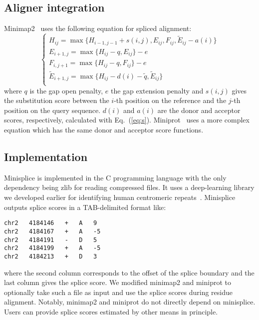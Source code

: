 \documentclass[webpdf,contemporary,large,namedate]{oup-authoring-template}%
\begin{document}
\subsection{Aligner integration}

Minimap2~\citep{Li:2018ab} uses the following equation for spliced alignment:
\begin{equation}\label{eq:splice}
\left\{\begin{array}{l}
H_{ij} = \max\{H_{i-1,j-1}+s(i,j),E_{ij},F_{ij},\tilde{E}_{ij}-a(i)\}\\
E_{i+1,j}= \max\{H_{ij}-q,E_{ij}\}-e\\
F_{i,j+1}= \max\{H_{ij}-q,F_{ij}\}-e\\
\tilde{E}_{i+1,j}= \max\{H_{ij}-d(i)-\tilde{q},\tilde{E}_{ij}\}\\
\end{array}\right.
\end{equation}
where $q$ is the gap open penalty, $e$ the gap extension penalty
and $s(i,j)$ gives the substitution score between the $i$-th position
on the reference and the $j$-th position on the query sequence.
$d(i)$ and $a(i)$ are the donor and acceptor scores, respectively, calculated with Eq.~(\ref{eq:s}).
Miniprot~\citep{Li:2023ab} uses a more complex equation which has the same donor and acceptor score functions.

\subsection{Implementation}

Minisplice is implemented in the C programming language with the only dependency
being zlib for reading compressed files.
It uses a deep-learning library we developed earlier for identifying human centromeric repeats~\citep{Li:2019aa}.
Minisplice outputs splice scores in a TAB-delimited format like:
\begin{verbatim}
chr2   4184146   +   A   9
chr2   4184167   +   A   -5
chr2   4184191   -   D   5
chr2   4184199   +   A   -5
chr2   4184213   +   D   3
\end{verbatim}
where the second column corresponds to the offset of the splice boundary
and the last column gives the splice score.
We modified minimap2 and miniprot to optionally take such a file as input
and use the splice scores during residue alignment.
Notably, minimap2 and miniprot do not directly depend on minisplice.
Users can provide splice scores estimated by other means in principle.
\end{document}
